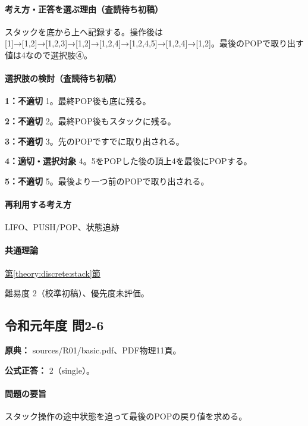 \paragraph{考え方・正答を選ぶ理由（査読待ち初稿）} スタックを底から上へ記録する。操作後は [1]→[1,2]→[1,2,3]→[1,2]→[1,2,4]→[1,2,4,5]→[1,2,4]→[1,2]。最後のPOPで取り出す値は4なので選択肢④。

\paragraph{選択肢の検討（査読待ち初稿）}\mbox{}\par

\noindent\textbf{1：不適切} 1。最終POP後も底に残る。\par

\noindent\textbf{2：不適切} 2。最終POP後もスタックに残る。\par

\noindent\textbf{3：不適切} 3。先のPOPですでに取り出される。\par

\noindent\textbf{4：適切・選択対象} 4。5をPOPした後の頂上4を最後にPOPする。\par

\noindent\textbf{5：不適切} 5。最後より一つ前のPOPで取り出される。\par

\paragraph{再利用する考え方} LIFO、PUSH/POP、状態追跡

\paragraph{共通理論} \hyperref[theory:discrete:stack]{第\ref*{theory:discrete:stack}節}

\par 難易度 2（校準初稿）、優先度未評価。

\subsection{令和元年度 問2-6}
\label{q:r01-reg-basic-2-6}

\noindent\textbf{原典：} sources/R01/basic.pdf、PDF物理11頁。

\textbf{公式正答：} 2（single）。

\paragraph{問題の要旨} スタック操作の途中状態を追って最後のPOPの戻り値を求める。

